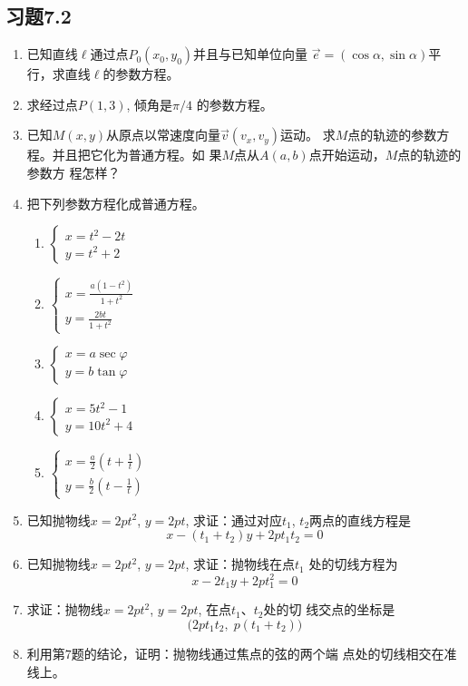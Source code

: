 \subsection*{习题7.2}
\begin{enumerate}
\item 已知直线$\ell$通过点$P_0(x_0,y_0)$并且与已知单位向量
$\vec{e}=(\cos\alpha,\sin\alpha)$平行，求直线$\ell$的参数方程。
\item 求经过点$P(1,3)$, 倾角是$\pi/4$
的参数方程。
\item 已知$M(x,y)$从原点以常速度向量$\vec{v}(v_x,v_y)$运动。
求$M$点的轨迹的参数方程。并且把它化为普通方程。如
果$M$点从$A(a,b)$点开始运动，$M$点的轨迹的参数方
程怎样？
\item 把下列参数方程化成普通方程。
\begin{multicols}{2}
\begin{enumerate}
    \item $\begin{cases}
        x=t^2-2t\\y=t^2+2
    \end{cases}$
    \item $\begin{cases}
        x=\frac{a(1-t^2)}{1+t^2}\\
        y=\frac{2bt}{1+t^2}
    \end{cases}$
    \item $\begin{cases}
        x=a\sec\varphi\\
        y=b\tan\varphi
    \end{cases}$
    \item $\begin{cases}
        x=5t^2-1\\y=10t^2+4
    \end{cases}$
    \item $\begin{cases}
        x=\frac{a}{2}\left(t+\frac{1}{t}\right)\\
        y=\frac{b}{2}\left(t-\frac{1}{t}\right)
    \end{cases}$
\end{enumerate}
\end{multicols}
\item 已知抛物线$x=2pt^2$, $y=2pt$, 求证：通过对应$t_1$,
$t_2$两点的直线方程是
\[x-(t_1+t_2)y+2pt_1t_2=0\]
\item 已知抛物线$x=2pt^2$, $y=2pt$, 求证：抛物线在点$t_1$
处的切线方程为
\[x-2t_1y+2pt_1^2=0\]
\item 求证：抛物线$x=2pt^2$, $y=2pt$, 在点$t_1$、$t_2$处的切
线交点的坐标是
\[\big(2pt_1t_2,\; p(t_1+t_2)\big)\]
\item 利用第7题的结论，证明：抛物线通过焦点的弦的两个端
点处的切线相交在准线上。

\end{enumerate}

